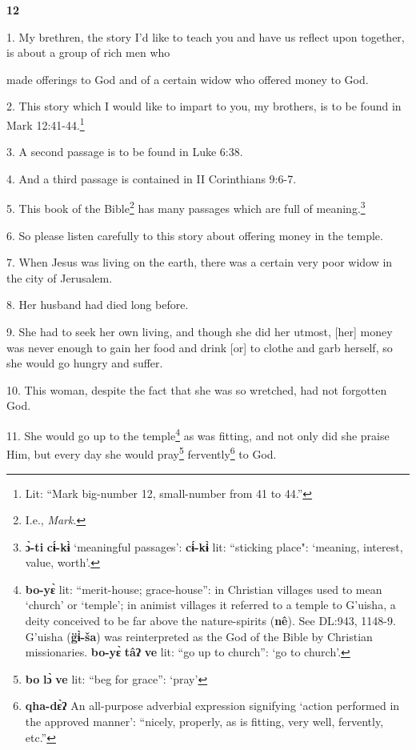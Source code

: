 \setcounter{footnote}{0}


\textbf{12}

1. My brethren, the story I'd like to teach you and have us reflect upon together,
is about a group of rich men who

made offerings to God and of a certain widow who offered money to God.

2. This story which I would like to impart to you, my brothers, is to be found in
Mark 12:41-44.\footnote{Lit: ``Mark big-number 12, small-number from 41 to 44.''}

3. A second passage is to be found in Luke 6:38.

4. And a third passage is contained in II Corinthians 9:6-7.

5. This book of the Bible\footnote{I.e., \textit{Mark}.} has many passages which are full of meaning.\footnote{\textbf{ɔ̀-ti} \textbf{cɨ́-kɨ̀} `meaningful passages': \textbf{cɨ́-kɨ̀} lit: ``sticking place": `meaning, interest, value, worth'.}

6. So please listen carefully to this story about offering money in the temple.

7. When Jesus was living on the earth, there was a certain very poor widow in the
city of Jerusalem.

8. Her husband had died long before.

9. She had to seek her own living, and though she did her utmost, [her] money was
never enough to gain her food and drink [or] to clothe and garb herself, so she
would go hungry and suffer.

10. This woman, despite the fact that she was so wretched, had not forgotten God.

11. She would go up to the temple\footnote{\textbf{bo-yɛ̀} lit: ``merit-house; grace-house'': in Christian villages used to mean `church' or `temple'; in animist villages it referred to a temple to G'uisha, a deity conceived to be far above the nature-spirits (\textbf{nê}). See DL:943, 1148-9. G'uisha (\textbf{g̈ɨ̀-ša}) was reinterpreted as the God of the Bible by Christian missionaries. \textbf{bo-yɛ̀} \textbf{tâʔ} \textbf{ve} lit: ``go up to church'': `go to church'.} as was fitting, and not only did she praise
Him, but every day she would pray\footnote{\textbf{bo} \textbf{lɔ̀} \textbf{ve} lit: ``beg for grace'': `pray'} fervently\footnote{\textbf{qha-dɛ̀ʔ} An all-purpose adverbial expression signifying `action performed in the approved manner': ``nicely, properly, as is fitting, very well, fervently, etc.''} to God.

